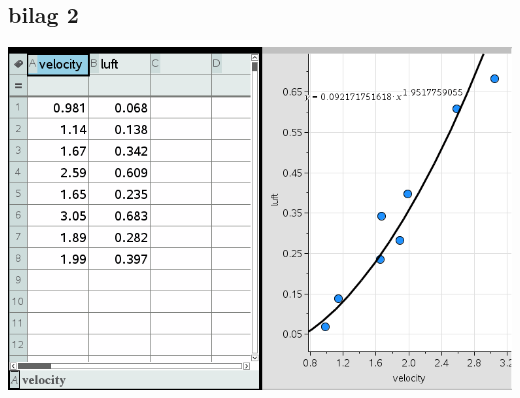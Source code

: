 \documentclass[12pt]{article}
\begin{document}
\subsection*{bilag 2}
\begin{center}
\includegraphics[width=\linewidth]{Ligningforluftmodstand.png}
\end{center}
\end{document}
